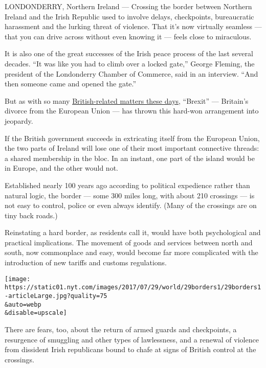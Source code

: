 LONDONDERRY, Northern Ireland --- Crossing the border between Northern
Ireland and the Irish Republic used to involve delays, checkpoints,
bureaucratic harassment and the lurking threat of violence. That it's
now virtually seamless --- that you can drive across without even
knowing it --- feels close to miraculous.

It is also one of the great successes of the Irish peace process of the
last several decades. ``It was like you had to climb over a locked
gate,'' George Fleming, the president of the Londonderry Chamber of
Commerce, said in an interview. ``And then someone came and opened the
gate.''

But as with so many
\href{https://www.nytimes.com/2017/07/20/world/europe/uk-brexit-conservative-party.html?rref=collection\%2Fnewseventcollection\%2Fbritain-brexit-european-union\&action=click\&contentCollection=europe\&region=stream\&module=stream_unit\&version=latest\&contentPlacement=4\&pgtype=collection}{British-related
matters these days}, ``Brexit'' --- Britain's divorce from the European
Union --- has thrown this hard-won arrangement into jeopardy.

If the British government succeeds in extricating itself from the
European Union, the two parts of Ireland will lose one of their most
important connective threads: a shared membership in the bloc. In an
instant, one part of the island would be in Europe, and the other would
not.

Established nearly 100 years ago according to political expedience
rather than natural logic, the border --- some 300 miles long, with
about 210 crossings --- is not easy to control, police or even always
identify. (Many of the crossings are on tiny back roads.)

Reinstating a hard border, as residents call it, would have both
psychological and practical implications. The movement of goods and
services between north and south, now commonplace and easy, would become
far more complicated with the introduction of new tariffs and customs
regulations.

\texttt{[image: https://static01.nyt.com/images/2017/07/29/world/29borders1/29borders1-articleLarge.jpg?quality=75\\\&auto=webp\\\&disable=upscale]}

There are fears, too, about the return of armed guards and checkpoints,
a resurgence of smuggling and other types of lawlessness, and a renewal
of violence from dissident Irish republicans bound to chafe at signs of
British control at the crossings.

